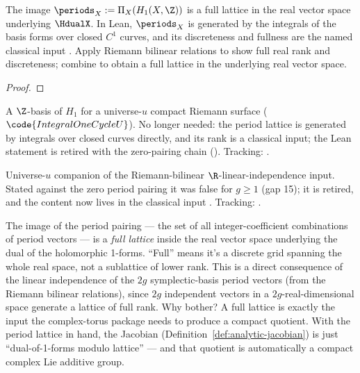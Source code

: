 \begin{theorem}
\label{thm:period-lattice}
The image \(\periods_X := \Pi_X(H_1(X,\Z))\) is a full lattice in the
real vector space underlying \(\HdualX\).
In Lean, \(\periods_X\) is generated by the integrals of the basis forms over closed
\(C^1\) curves, and its discreteness and fullness are the named classical input
.
\leanok
\proofplan
Apply Riemann bilinear relations to show full real rank and discreteness; combine
to obtain a full lattice in the underlying real vector space.
\end{theorem}
\begin{proof}
\leanok
\end{proof}

\begin{lemma}
\label{lem:h1-basis-of-compact-riemann-surface-u}
A \(\Z\)-basis of \(H_1\) for a universe-\(u\) compact Riemann surface
(\(\code{IntegralOneCycleU}\)). No longer needed: the period lattice is generated by
integrals over closed curves directly, and its rank is a classical input; the Lean
statement is retired with the zero-pairing chain ().
Tracking: .
\end{lemma}

\begin{lemma}
\label{lem:riemann-classical-real-li-input-u}
Universe-\(u\) companion of the Riemann-bilinear \(\R\)-linear-independence
input. Stated against the zero period pairing it was false for \(g\ge1\) (gap 15); it is
retired, and the content now lives in the classical input
.
Tracking: .
\end{lemma}

\begin{layman}
The image of the period pairing --- the set of all integer-coefficient
combinations of period vectors --- is a \emph{full lattice} inside the
real vector space underlying the dual of the holomorphic 1-forms.
``Full'' means it's a discrete grid spanning the whole real space, not
a sublattice of lower rank. This is a direct consequence of the linear
independence of the \(2g\) symplectic-basis period vectors (from the
Riemann bilinear relations), since \(2g\) independent vectors in a
\(2g\)-real-dimensional space generate a lattice of full rank. Why
bother? A full lattice is exactly the input the complex-torus package
needs to produce a compact quotient. With the period lattice in
hand, the Jacobian (Definition~\ref{def:analytic-jacobian}) is just
``dual-of-1-forms modulo lattice'' --- and that quotient is
automatically a compact complex Lie additive group.
\end{layman}

